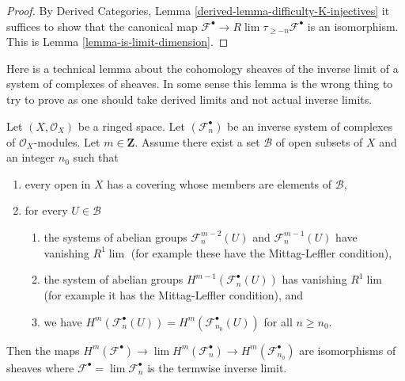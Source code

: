 \begin{proof}
By Derived Categories, Lemma \ref{derived-lemma-difficulty-K-injectives}
it suffices to show that the canonical map
$\mathcal{F}^\bullet \to R\lim \tau_{\geq -n} \mathcal{F}^\bullet$
is an isomorphism. This is Lemma \ref{lemma-is-limit-dimension}.
\end{proof}

\noindent
Here is a technical lemma about the cohomology sheaves of the inverse
limit of a system of complexes of sheaves. In some sense this lemma
is the wrong thing to try to prove as one should take derived
limits and not actual inverse limits.

\begin{lemma}
\label{lemma-inverse-limit-complexes}
Let $(X, \mathcal{O}_X)$ be a ringed space. Let $(\mathcal{F}_n^\bullet)$
be an inverse system of complexes of $\mathcal{O}_X$-modules.
Let $m \in \mathbf{Z}$. Assume there exist a set $\mathcal{B}$
of open subsets of $X$ and an integer $n_0$ such that
\begin{enumerate}
\item every open in $X$ has a covering whose members are
elements of $\mathcal{B}$,
\item for every $U \in \mathcal{B}$
\begin{enumerate}
\item the systems of abelian groups
$\mathcal{F}_n^{m - 2}(U)$ and $\mathcal{F}_n^{m - 1}(U)$
have vanishing $R^1\lim$ (for example these have the Mittag-Leffler
condition),
\item the system of abelian groups $H^{m - 1}(\mathcal{F}_n^\bullet(U))$
has vanishing $R^1\lim$ (for example it has the Mittag-Leffler condition), and
\item we have
$H^m(\mathcal{F}_n^\bullet(U)) = H^m(\mathcal{F}_{n_0}^\bullet(U))$
for all $n \geq n_0$.
\end{enumerate}
\end{enumerate}
Then the maps
$H^m(\mathcal{F}^\bullet) \to \lim H^m(\mathcal{F}_n^\bullet) \to
H^m(\mathcal{F}_{n_0}^\bullet)$
are isomorphisms of sheaves where
$\mathcal{F}^\bullet = \lim \mathcal{F}_n^\bullet$ is the termwise
inverse limit.
\end{lemma}

